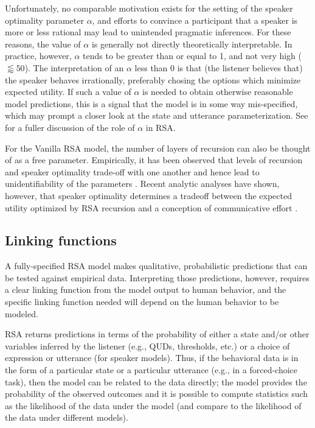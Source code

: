 \documentclass{sp}
\begin{document}
Unfortunately,  no comparable motivation exists for the setting of the speaker optimality parameter $\alpha$, and efforts to convince a participant that a speaker is more or less rational may lead to unintended pragmatic inferences. For these reasons, the value of $\alpha$ is generally not directly theoretically interpretable. In practice, however, $\alpha$ tends to be greater than or equal to 1, and not very high ($\lessapprox 50$). The interpretation of an $\alpha$ less than 0 is that (the listener believes that) the speaker behaves irrationally, preferably chosing the options which minimize expected utility. If such a value of $\alpha$ is needed to obtain otherwise reasonable model predictions, this is a signal that the model is in some way mis-specified, which may prompt a closer look at the state and utterance parameterization.  See \cite{zaslavsky2020rate} for a fuller discussion of the role of $\alpha$ in RSA.

For the Vanilla RSA model, the number of layers of recursion can also be thought of as a free parameter. Empirically, it has been observed that levels of recursion and speaker optimality trade-off with one another  and hence lead to unidentifiability of the parameters \citep{frank2016rational}. Recent analytic analyses have shown, however, that speaker optimality determines a tradeoff between the expected utility optimized by RSA recursion and a conception of communicative effort \citep{zaslavsky2020rate}.

\subsection{Linking functions}

A fully-specified RSA model makes qualitative, probabilistic predictions that can be tested against empirical data.
Interpreting those predictions, however, requires a clear linking function from the model output to human behavior, and the specific linking function needed will depend on the human behavior to be modeled.

RSA returns predictions in terms of the probability of either a state and/or other variables inferred by the listener (e.g., QUDs, thresholds, etc.) or a choice of expression or utterance (for speaker models).
Thus, if the behavioral data is in the form of a particular state or a particular utterance (e.g., in a forced-choice task), then the model can be related to the data directly; the model provides the probability of the observed outcomes and it is possible to compute statistics such as the likelihood of the data under the model (and compare to the likelihood of the data under different models). 
\end{document}
